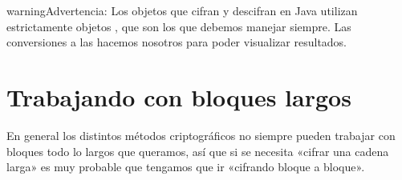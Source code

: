 \documentclass[letterpaper,10pt,spanish]{sphinxmanual}
\begin{document}
\begin{sphinxVerbatim}[commandchars=\\\{\}]

                 
                \PYG{o}{[}\PYG{o}{]} 
                 
                                  
\end{sphinxVerbatim}

\begin{sphinxadmonition}{warning}{Advertencia:}
Los objetos que cifran y descifran en Java utilizan estrictamente objetos , que
son los que debemos manejar siempre. Las conversiones a  las hacemos nosotros para poder visualizar resultados.
\end{sphinxadmonition}


\section{Trabajando con bloques largos}
\label{\detokenize{textos/tema5:trabajando-con-bloques-largos}}
En general los distintos métodos criptográficos no siempre pueden trabajar con bloques todo lo largos que queramos, así que si se necesita «cifrar una cadena larga» es muy probable que tengamos que ir «cifrando bloque a bloque».
\end{document}
